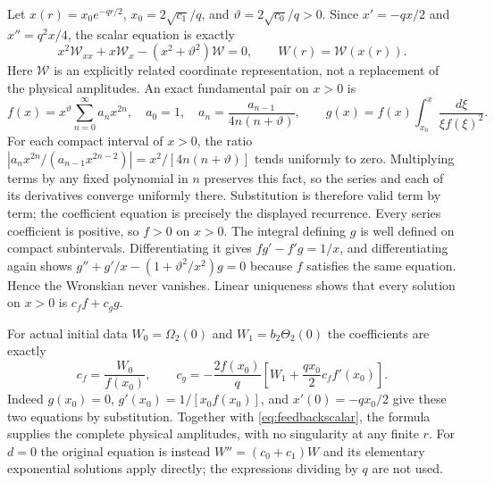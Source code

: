 \documentclass[11pt]{article}
\begin{document}
Let $x(r)=x_0e^{-qr/2}$, $x_0=2\sqrt{c_1}/q$, and
$\vartheta=2\sqrt{c_0}/q>0$. Since
$x'=-qx/2$ and $x''=q^2x/4$, the scalar equation is exactly
\[
 x^2\mathcal W_{xx}+x\mathcal W_x-(x^2+\vartheta^2)\mathcal W=0,
 \qquad W(r)=\mathcal W(x(r)).
\]
Here $\mathcal W$ is an explicitly related coordinate representation,
not a replacement of the physical amplitudes.
An exact fundamental pair on $x>0$ is
\[
 f(x)=x^{\vartheta}\sum_{n=0}^\infty a_nx^{2n},\quad
 a_0=1,\quad a_n=\frac{a_{n-1}}{4n(n+\vartheta)},\qquad
 g(x)=f(x)\int_{x_0}^x\frac{d\xi}{\xi f(\xi)^2}.
\]
For each compact interval of $x>0$, the ratio
$|a_nx^{2n}/(a_{n-1}x^{2n-2})|=x^2/[4n(n+\vartheta)]$
tends uniformly to zero. Multiplying terms by any fixed polynomial in
$n$ preserves this fact, so the series and each of its derivatives
converge uniformly there. Substitution is therefore valid term by term;
the coefficient equation is precisely the displayed recurrence.
Every series coefficient is positive, so $f>0$ on $x>0$.
The integral defining $g$ is well defined on compact subintervals.
Differentiating it gives $fg'-f'g=1/x$, and differentiating again
shows $g''+g'/x-(1+\vartheta^2/x^2)g=0$ because $f$ satisfies
the same equation. Hence the Wronskian never vanishes.
Linear uniqueness shows that every solution on $x>0$ is $c_ff+c_gg$.

For actual initial data $W_0=\Omega_2(0)$ and
$W_1=b_2\Theta_2(0)$ the coefficients are exactly
\[
 c_f=\frac{W_0}{f(x_0)},\qquad
 c_g=-\frac{2f(x_0)}q\left[W_1+\frac{qx_0}{2}c_ff'(x_0)\right].
\]
Indeed $g(x_0)=0$, $g'(x_0)=1/[x_0f(x_0)]$, and
$x'(0)=-qx_0/2$ give these two equations by substitution.
Together with \eqref{eq:feedbackscalar}, the formula supplies the
complete physical amplitudes, with no singularity at any finite $r$.
For $d=0$ the original equation is instead
$W''=(c_0+c_1)W$ and its elementary exponential solutions apply
directly; the expressions dividing by $q$ are not used.
\end{document}
